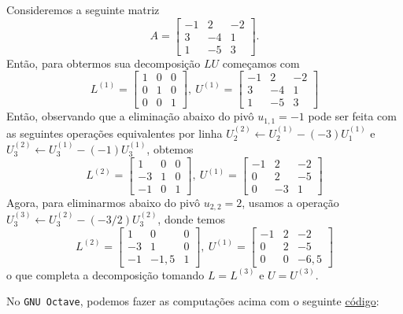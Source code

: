 \begin{ex}\label{ex:lu}
  Consideremos a seguinte matriz
  \begin{equation}
    A =
    \begin{bmatrix}
      -1 & 2 & -2\\
      3 & -4 & 1\\
      1 & -5 & 3
    \end{bmatrix}.
  \end{equation}
  Então, para obtermos sua decomposição $LU$ começamos com
  \begin{equation}
    L^{(1)} =
    \begin{bmatrix}
      1 & 0 & 0\\
      0 & 1 & 0\\
      0 & 0 & 1
    \end{bmatrix}, ~
    U^{(1)} =
    \begin{bmatrix}
      -1 & 2 & -2\\
      3 & -4 & 1\\
      1 & -5 & 3
    \end{bmatrix}
  \end{equation}
  Então, observando que a eliminação abaixo do pivô $u_{1,1}=-1$ pode ser feita com as seguintes operações equivalentes por linha $U_2^{(2)} \leftarrow U_2^{(1)} - (-3)U_1^{(1)}$ e $U_3^{(2)} \leftarrow U_3^{(1)} - (-1)U_3^{(1)}$, obtemos
  \begin{equation}
    L^{(2)} =
    \begin{bmatrix}
      1 & 0 & 0\\
      -3 & 1 & 0\\
      -1 & 0 & 1
    \end{bmatrix}, ~
    U^{(1)} =
    \begin{bmatrix}
      -1 & 2 & -2\\
      0 & 2 & -5\\
      0 & -3 & 1
    \end{bmatrix}
  \end{equation}
  Agora, para eliminarmos abaixo do pivô $u_{2,2}=2$, usamos a operação $U_3^{(3)} \leftarrow U_3^{(2)} - (-3/2)U_3^{(2)}$, donde temos
  \begin{equation}
    L^{(2)} =
    \begin{bmatrix}
      1 & 0 & 0\\
      -3 & 1 & 0\\
      -1 & -1,5 & 1
    \end{bmatrix}, ~
    U^{(1)} =
    \begin{bmatrix}
      -1 & 2 & -2\\
      0 & 2 & -5\\
      0 & 0 & -6,5
    \end{bmatrix}
  \end{equation}
o que completa a decomposição tomando $L = L^{(3)}$ e $U = U^{(3)}$.

\ifisoctave
No \verb+GNU Octave+, podemos fazer as computações acima com o seguinte \href{https://github.com/phkonzen/notas/blob/master/src/MatematicaNumerica/cap_sl_direto/dados/ex_lu/ex_lu.m}{código}:

\fi
\end{ex}


